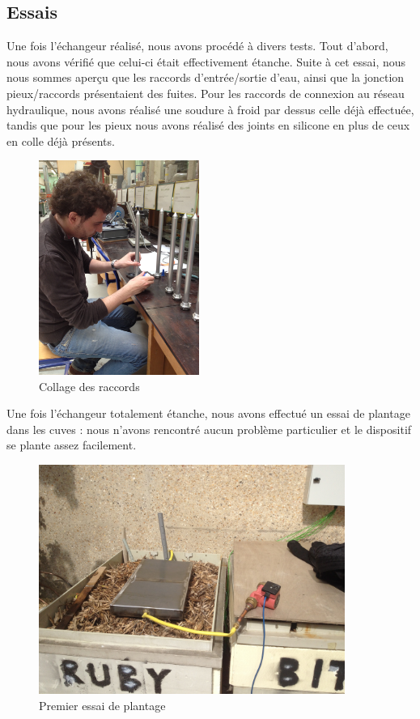 \documentclass[../PS6_RapportFinal.tex]{subfiles}
\begin{document}
\graphicspath{{img/}{tex/img/}}
\subsection{Essais}

Une fois l'échangeur réalisé, nous avons procédé à divers tests. Tout d'abord, nous avons vérifié que celui-ci était effectivement étanche. Suite à cet essai, nous nous sommes aperçu que les raccords d'entrée/sortie d'eau, ainsi que la jonction pieux/raccords présentaient des fuites. Pour les raccords de connexion au réseau hydraulique, nous avons réalisé une soudure à froid par dessus celle déjà effectuée, tandis que pour les pieux nous avons réalisé des joints en silicone en plus de ceux en colle déjà présents.

\begin{figure}[!h]
\begin{center}
\includegraphics[height=7cm]{3_1_photo1.jpg}
\caption{Collage des raccords}
\end{center}
\end{figure}

Une fois l'échangeur totalement étanche, nous avons effectué un essai de plantage dans les cuves : nous n'avons rencontré aucun problème particulier et le dispositif se plante assez facilement. 

\begin{figure}[!h]
\begin{center}
\includegraphics[width=10cm]{3_3_Plantage.jpg}
\caption{Premier essai de plantage}
\end{center}
\end{figure}
\end{document}
